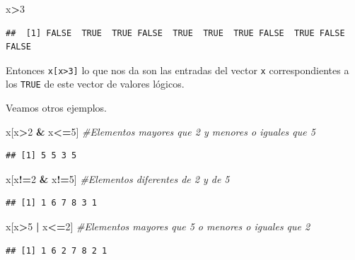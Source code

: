 \documentclass[]{book}
\newenvironment{Shaded}{\begin{snugshade}}{\end{snugshade}}
\newcommand{\CommentTok}[1]{\textcolor[rgb]{0.56,0.35,0.01}{\textit{#1}}}
\newcommand{\DecValTok}[1]{\textcolor[rgb]{0.00,0.00,0.81}{#1}}
\newcommand{\NormalTok}[1]{#1}
\newcommand{\OperatorTok}[1]{\textcolor[rgb]{0.81,0.36,0.00}{\textbf{#1}}}
\newcommand{\StringTok}[1]{\textcolor[rgb]{0.31,0.60,0.02}{#1}}
\theoremstyle{definition}
\theoremstyle{definition}
\theoremstyle{definition}
\theoremstyle{remark}
\begin{document}
\begin{Shaded}
\begin{Highlighting}[]
\NormalTok{x}\OperatorTok{>}\DecValTok{3}
\end{Highlighting}
\end{Shaded}

\begin{verbatim}
##  [1] FALSE  TRUE  TRUE FALSE  TRUE  TRUE  TRUE FALSE  TRUE FALSE FALSE
\end{verbatim}

Entonces \texttt{x{[}x\textgreater{}3{]}} lo que nos da son las entradas del vector \texttt{x} correspondientes a los \texttt{TRUE} de este vector de valores lógicos.

Veamos otros ejemplos.

\begin{Shaded}
\begin{Highlighting}[]
\NormalTok{x[x}\OperatorTok{>}\DecValTok{2} \OperatorTok{&}\StringTok{ }\NormalTok{x}\OperatorTok{<=}\DecValTok{5}\NormalTok{] }\CommentTok{#Elementos mayores que 2 y menores o iguales que 5}
\end{Highlighting}
\end{Shaded}

\begin{verbatim}
## [1] 5 5 3 5
\end{verbatim}

\begin{Shaded}
\begin{Highlighting}[]
\NormalTok{x[x}\OperatorTok{!=}\DecValTok{2} \OperatorTok{&}\StringTok{ }\NormalTok{x}\OperatorTok{!=}\DecValTok{5}\NormalTok{] }\CommentTok{#Elementos diferentes de 2 y de 5}
\end{Highlighting}
\end{Shaded}

\begin{verbatim}
## [1] 1 6 7 8 3 1
\end{verbatim}

\begin{Shaded}
\begin{Highlighting}[]
\NormalTok{x[x}\OperatorTok{>}\DecValTok{5} \OperatorTok{|}\StringTok{ }\NormalTok{x}\OperatorTok{<=}\DecValTok{2}\NormalTok{] }\CommentTok{#Elementos mayores que 5 o menores o iguales que 2}
\end{Highlighting}
\end{Shaded}

\begin{verbatim}
## [1] 1 6 2 7 8 2 1
\end{verbatim}
\end{document}
